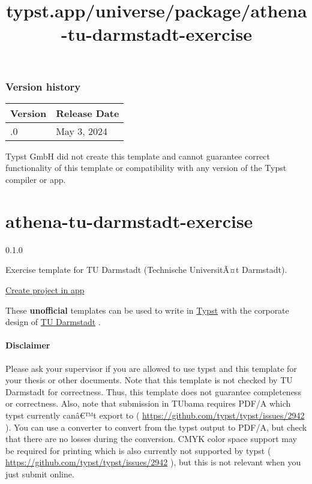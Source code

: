 \subsubsection{Version history}\label{version-history}

\begin{longtable}[]{@{}ll@{}}
\toprule\noalign{}
Version & Release Date \\
\midrule\noalign{}
\endhead
\bottomrule\noalign{}
\endlastfoot
0.1.0 & May 3, 2024 \\
\end{longtable}

Typst GmbH did not create this template and cannot guarantee correct
functionality of this template or compatibility with any version of the
Typst compiler or app.


\title{typst.app/universe/package/athena-tu-darmstadt-exercise}

\label{banner}
\label{template-thumbnail}

\section{athena-tu-darmstadt-exercise}\label{athena-tu-darmstadt-exercise}

{ 0.1.0 }

Exercise template for TU Darmstadt (Technische UniversitÃ¤t Darmstadt).

\href{/app?template=athena-tu-darmstadt-exercise&version=0.1.0}{Create
project in app}

\label{readme}
These \textbf{unofficial} templates can be used to write in
\href{https://github.com/typst/typst}{Typst} with the corporate design
of \href{https://www.tu-darmstadt.de/}{TU Darmstadt} .

\paragraph{Disclaimer}\label{disclaimer}

Please ask your supervisor if you are allowed to use typst and this
template for your thesis or other documents. Note that this template is
not checked by TU Darmstadt for correctness. Thus, this template does
not guarantee completeness or correctness. Also, note that submission in
TUbama requires PDF/A which typst currently canâ€™t export to (
\url{https://github.com/typst/typst/issues/2942} ). You can use a
converter to convert from the typst output to PDF/A, but check that
there are no losses during the conversion. CMYK color space support may
be required for printing which is also currently not supported by typst
( \url{https://github.com/typst/typst/issues/2942} ), but this is not
relevant when you just submit online.

